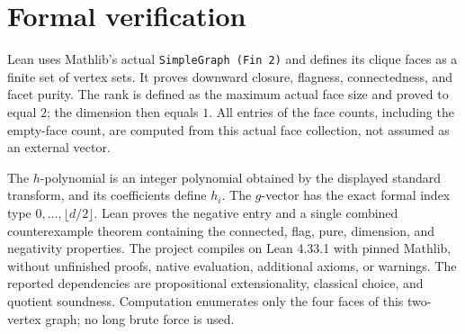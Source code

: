 \documentclass[10pt]{article}
\begin{document}
\section*{Formal verification}
Lean uses Mathlib's actual \texttt{SimpleGraph (Fin 2)} and defines its
clique faces as a finite set of vertex sets. It proves downward closure,
flagness, connectedness, and facet purity. The rank is defined as the
maximum actual face size and proved to equal $2$; the dimension then
equals $1$. All entries of the face counts, including the empty-face
count, are computed from this actual face collection, not assumed as
an external vector.

The $h$-polynomial is an integer polynomial obtained by the displayed
standard transform, and its coefficients define $h_i$. The $g$-vector
has the exact formal index type $0,\ldots,\lfloor d/2\rfloor$.
Lean proves the negative entry and a single combined counterexample
theorem containing the connected, flag, pure, dimension, and negativity
properties. The project compiles on Lean 4.33.1 with pinned Mathlib,
without unfinished proofs, native evaluation, additional axioms, or
warnings. The reported dependencies are propositional extensionality,
classical choice, and quotient soundness. Computation enumerates only
the four faces of this two-vertex graph; no long brute force is used.
\end{document}
